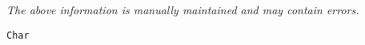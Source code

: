 \label{pkg:char}

{\tiny \it The above information is manually maintained and may contain errors.}
\begin{verbatim}
Char
\end{verbatim}
